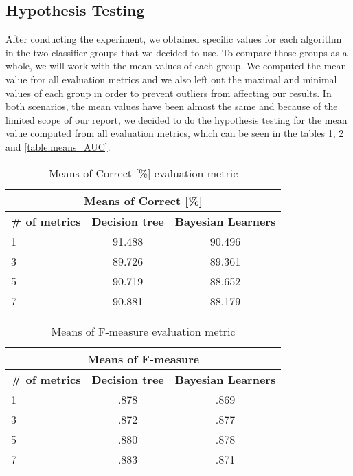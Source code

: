 \subsection{Hypothesis Testing}
After conducting the experiment, we obtained specific values for each algorithm in the two classifier groups that we decided to use. To compare those groups as a whole, we will work with the mean values of each group. We computed the mean value fror all evaluation metrics and we also left out the maximal and minimal values of each group in order to prevent outliers from affecting our results. In both scenarios, the mean values have been almost the same and because of the limited scope of our report, we decided to do the hypothesis testing for the mean value computed from all evaluation metrics, which can be seen in the tables \ref{table:means_correct}, \ref{table:means_F-measure} and \ref{table:means_AUC}.
\begin{table}[h!]
\centering
\begin{tabular}{ |l|c|c| }
\hline
\multicolumn{3}{|c|}{\textbf{Means of Correct [\%]}}\\
 \hline
 \textbf{\# of metrics} & \textbf{Decision tree} & \textbf{Bayesian Learners}  \\
 \hline
 1 & 91.488 & 90.496\\
 \hline
 3 &  89.726 & 89.361\\
 \hline
 5 & 90.719 & 88.652\\
 \hline
 7 & 90.881 &  88.179\\
 \hline
\end{tabular}
\caption{Means of Correct [\%] evaluation metric}
\label{table:means_correct}
\end{table} 

\begin{table}[h!]
\centering
\begin{tabular}{ |l|c|c| }
 \hline
 \multicolumn{3}{|c|}{\textbf{Means of F-measure}}\\ \hline
 \textbf{\# of metrics} & \textbf{Decision tree} & \textbf{Bayesian Learners}  \\
 \hline
 1 & .878 & .869\\
 \hline
 3 &  .872 & .877\\
 \hline
 5 & .880 & .878\\
 \hline
 7 & .883 &  .871\\
 \hline
\end{tabular}
\caption{Means of F-measure evaluation metric}
\label{table:means_F-measure}
\end{table} 

